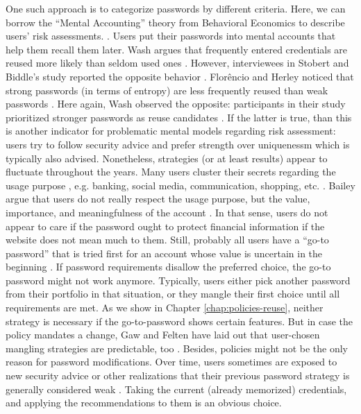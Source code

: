 	One such approach is to categorize passwords by different criteria. Here, we can borrow the ``Mental Accounting'' theory from Behavioral Economics to describe users' risk assessments. \cite{Stockinger2015TowardsBE,Thaler2004}. Users put their passwords into mental accounts that help them recall them later. 
	Wash \etal argues that frequently entered credentials are reused more likely than seldom used ones \cite{Wash2016UnderstandingPasswordChoices}. However, interviewees in Stobert and Biddle's study reported the opposite behavior \cite{Stobert2014PasswordLifeCycle}. 
	Florêncio and Herley noticed that strong passwords (in terms of entropy) are less frequently reused than weak passwords \cite{Florencio2007LargeScaleStudyPasswordHabits}. Here again, Wash \etal observed the opposite: participants in their study prioritized stronger passwords as reuse candidates \cite{Wash2016UnderstandingPasswordChoices}. If the latter is true, than this is another indicator for problematic mental models regarding risk assessment: users try to follow security advice and prefer strength over uniquenessm which is typically also advised. Nonetheless, strategies (or at least results) appear to fluctuate throughout the years. 
	Many users cluster their secrets regarding the usage purpose \cite{Haque2014Hierarchy}, e.g. banking, social media, communication, shopping, etc. \cite{Notoatmodjo2007ExploringWeakestLink,Stobert2014PWMThatDoesntRemember}. Bailey \etal argue that users do not really respect the usage purpose, but the value, importance, and meaningfulness of the account \cite{Bailey2014StatisticsReuse}. In that sense, users do not appear to care if the password ought to protect financial information if the website does not mean much to them. Still, probably all users have a ``go-to password'' that is tried first for an account whose value is uncertain in the beginning \cite{Stobert2014PasswordLifeCycle}. 
	If password requirements disallow the preferred choice, the go-to password might not work anymore. Typically, users either pick another password from their portfolio in that situation, or they mangle their first choice until all requirements are met. As we show in Chapter \ref{chap:policies-reuse}, neither strategy is necessary if the go-to-password shows certain features. But in case the policy mandates a change, Gaw and Felten have laid out that user-chosen mangling strategies are predictable, too \cite{Gaw2006PasswordManagement}. Besides, policies might not be the only reason for password modifications. Over time, users sometimes are exposed to new security advice or other realizations that their previous password strategy is generally considered weak \cite{VonZezschwitz2013SurvivalShortest}. Taking the current (already memorized) credentials, and applying the recommendations to them is an obvious choice. 
		
